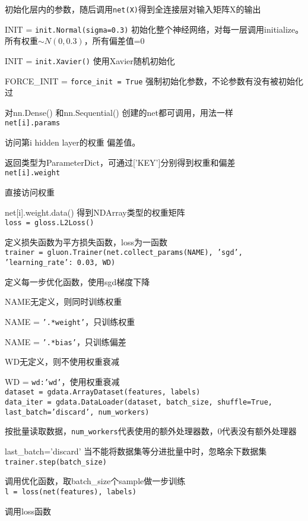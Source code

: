 \documentclass[UTF8]{ctexart}
\begin{document}
  初始化层内的参数，随后调用\texttt{net(X)}得到全连接层对输入矩阵X的输出
  
  INIT = \texttt{init.Normal(sigma=0.3)} 初始化整个神经网络，对每一层调用initialize。所有权重$\sim N(0, 0.3)$，所有偏差值=0

  INIT = \texttt{init.Xavier()} 使用Xavier随机初始化
  
  FORCE\_INIT = \texttt{force\_init = True} 强制初始化参数，不论参数有没有被初始化过
  
  对nn.Dense() 和nn.Sequential() 创建的net都可调用，用法一样\\
\texttt{net[i].params}

  访问第i hidden layer的权重 偏差值。
  
  返回类型为ParameterDict，可通过['KEY']分别得到权重和偏差\\
\texttt{net[i].weight} 
  
  直接访问权重

  net[i].weight.data() 得到NDArray类型的权重矩阵\\
\texttt{loss = gloss.L2Loss()}
  
  定义损失函数为平方损失函数，loss为一函数\\
\texttt{trainer = gluon.Trainer(net.collect\_params(NAME), 'sgd', {'learning\_rate': 0.03}, WD)}

  定义每一步优化函数，使用sgd梯度下降
  
  NAME无定义，则同时训练权重
  
  \quad NAME = \texttt{'.*weight'}，只训练权重 
  
  \quad NAME = \texttt{'.*bias'}，只训练偏差
    
  WD无定义，则不使用权重衰减
  
  \quad WD = \texttt{wd:'wd'}，使用权重衰减\\
\texttt{dataset = gdata.ArrayDataset(features, labels)}\\
\texttt{data\_iter = gdata.DataLoader(dataset, batch\_size, shuffle=True, last\_batch='discard', num\_workers)}

  按批量读取数据，\texttt{num\_workers}代表使用的额外处理器数，0代表没有额外处理器
  
  last\_batch='discard' 当不能将数据集等分进批量中时，忽略余下数据集\\
\texttt{trainer.step(batch\_size)}

  调用优化函数，取batch\_size个sample做一步训练\\
\texttt{l = loss(net(features), labels)}

  调用loss函数
\end{document}
